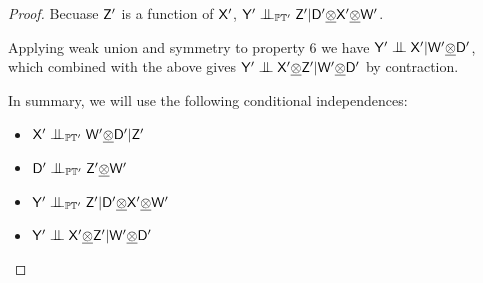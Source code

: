 \begin{proof}
Becuase $\mathsf{Z}'$ is a function of $\mathsf{X}'$, $\RV{Y}'\CI_{\prob{P}\kernel{T}'}\RV{Z}'|\RV{D}'\utimes\RV{X}'\utimes\RV{W}'$. 

Applying weak union and symmetry to property 6 we have $\RV{Y}'\CI \RV{X}'|\RV{W}'\utimes\RV{D}'$, which combined with the above gives $\RV{Y}'\CI \RV{X}'\utimes \RV{Z}' |\RV{W}'\utimes\RV{D}'$ by contraction.

In summary, we will use the following conditional independences:
\begin{itemize}
    \item $\RV{X}'\CI_{\prob{P}\kernel{T}'} \RV{W}'\utimes \RV{D}'|\RV{Z}'$
    \item $\RV{D}'\CI_{\prob{P}\kernel{T}'}\RV{Z}'\utimes \RV{W}'$
    \item $\RV{Y}'\CI_{\prob{P}\kernel{T}'}\RV{Z}'|\RV{D}'\utimes\RV{X}'\utimes\RV{W}'$
    \item $\RV{Y}'\CI \RV{X}'\utimes \RV{Z}'|\RV{W}'\utimes\RV{D}'$
\end{itemize}


\end{proof}
